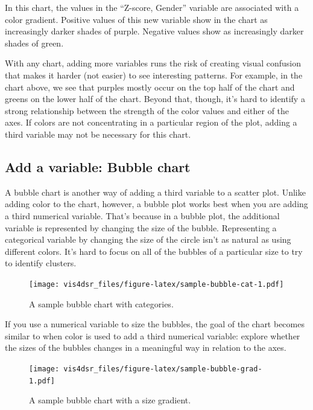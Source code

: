 \documentclass[
]{krantz}
\begin{document}
In this chart, the values in the ``Z-score, Gender'' variable are associated with
a color gradient. Positive values of this new variable show in the chart as
increasingly darker shades of purple. Negative values show as increasingly darker
shades of green.

With any chart, adding more variables runs the risk of creating visual confusion
that makes it harder (not easier) to see interesting patterns. For example,
in the chart above, we see that purples mostly occur on the top half of the chart
and greens on the lower half of the chart. Beyond that, though, it's hard to identify
a strong relationship between the strength of the color values and either of the axes.
If colors are not concentrating in a particular region of the plot, adding a third
variable may not be necessary for this chart.

\hypertarget{add-a-variable-bubble-chart}{%
\subsection{Add a variable: Bubble chart}\label{add-a-variable-bubble-chart}}

A bubble chart is another way of adding a third variable to a scatter plot. Unlike
adding color to the chart, however, a bubble plot works best when you are adding a
third numerical variable. That's because in a bubble plot, the additional variable
is represented by changing the size of the bubble. Representing a categorical variable
by changing the size of the circle isn't as natural as using different colors. It's
hard to focus on all of the bubbles of a particular size to try to identify clusters.

\begin{figure}
\centering
\texttt{[image: vis4dsr\_files/figure-latex/sample-bubble-cat-1.pdf]}
\caption{\label{fig:sample-bubble-cat}A sample bubble chart with categories.}
\end{figure}

If you use a numerical variable to size the bubbles, the goal of the chart becomes
similar to when color is used to add a third numerical variable: explore whether
the sizes of the bubbles changes in a meaningful way in relation to the axes.

\begin{figure}
\centering
\texttt{[image: vis4dsr\_files/figure-latex/sample-bubble-grad-1.pdf]}
\caption{\label{fig:sample-bubble-grad}A sample bubble chart with a size gradient.}
\end{figure}
\end{document}
